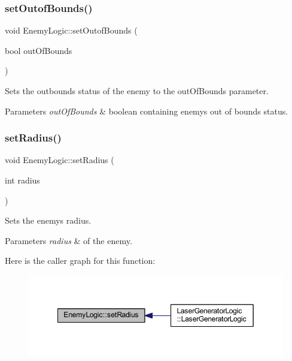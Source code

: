 \subsubsection{\texorpdfstring{set\+Outof\+Bounds()}{setOutofBounds()}}
{\footnotesize\ttfamily void Enemy\+Logic\+::set\+Outof\+Bounds (\begin{DoxyParamCaption}\item[{bool}]{out\+Of\+Bounds }\end{DoxyParamCaption})}



Sets the outbounds status of the enemy to the out\+Of\+Bounds parameter. 


\begin{DoxyParams}{Parameters}
{\em out\+Of\+Bounds} & boolean containing enemy\textquotesingle{}s out of bounds status. \\
\hline
\end{DoxyParams}
\mbox{\label{class_enemy_logic_acabb2cb226edc71300ba1f2bc3e7a577}} 
\subsubsection{\texorpdfstring{set\+Radius()}{setRadius()}}
{\footnotesize\ttfamily void Enemy\+Logic\+::set\+Radius (\begin{DoxyParamCaption}\item[{int}]{radius }\end{DoxyParamCaption})}



Sets the enemy\textquotesingle{}s radius. 


\begin{DoxyParams}{Parameters}
{\em radius} & of the enemy. \\
\hline
\end{DoxyParams}
Here is the caller graph for this function\+:\nopagebreak
\begin{figure}[H]
\begin{center}
\leavevmode
\includegraphics[width=349pt]{class_enemy_logic_acabb2cb226edc71300ba1f2bc3e7a577_icgraph}
\end{center}
\end{figure}


